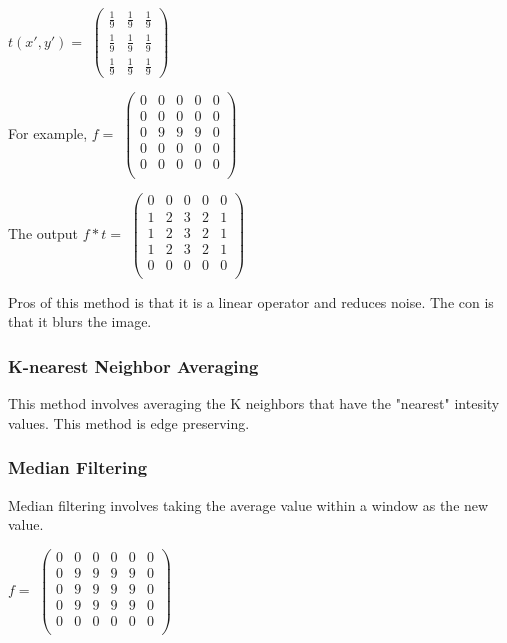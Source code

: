 \documentclass{article}
\begin{document}
\begin{multicols}{2}
$t(x',y') =$
$\begin{pmatrix}
  \frac{1}{9} & \frac{1}{9} & \frac{1}{9}\\
  \frac{1}{9} & \frac{1}{9} & \frac{1}{9}\\
  \frac{1}{9} & \frac{1}{9} & \frac{1}{9}
\end{pmatrix}$

For example,
$f = $
$\begin{pmatrix}
  0 & 0 & 0 & 0 & 0\\
  0 & 0 & 0 & 0 & 0\\
  0 & 9 & 9 & 9 & 0\\
  0 & 0 & 0 & 0 & 0\\
  0 & 0 & 0 & 0 & 0\\
\end{pmatrix}$

The output
$f * t =$
$\begin{pmatrix}
  0 & 0 & 0 & 0 & 0\\
  1 & 2 & 3 & 2 & 1\\
  1 & 2 & 3 & 2 & 1\\
  1 & 2 & 3 & 2 & 1\\
  0 & 0 & 0 & 0 & 0\\
\end{pmatrix}$

Pros of this method is that it is a linear operator and reduces noise. The con is that it blurs the image.

\subsubsection{K-nearest Neighbor Averaging}

This method involves averaging the K neighbors that have the "nearest" intesity values. This method is edge preserving.

\subsubsection{Median Filtering}

Median filtering involves taking the average value within a window as the new value.

$f = $
$\begin{pmatrix}
  0 & 0 & 0 & 0 & 0 & 0\\
  0 & 9 & 9 & 9 & 9 & 0\\
  0 & 9 & 9 & 9 & 9 & 0\\
  0 & 9 & 9 & 9 & 9 & 0\\
  0 & 0 & 0 & 0 & 0 & 0\\
\end{pmatrix}$


\end{multicols}
\end{document}
